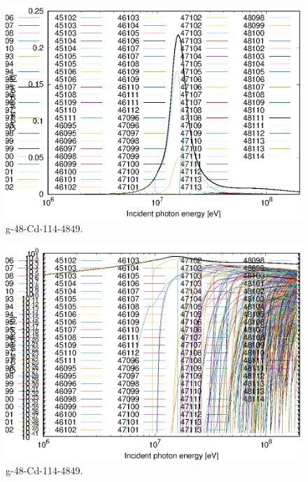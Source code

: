 \begin{figure}
 \includegraphics[width=\linewidth]{eps/g_48-Cd-114_4849.eps}
  \caption{g-48-Cd-114-4849.}
\end{figure}
\begin{figure}
 \includegraphics[width=\linewidth]{eps-log/g_48-Cd-114_4849.eps}
 \caption{g-48-Cd-114-4849.}
\end{figure}
\newpage \clearpage

